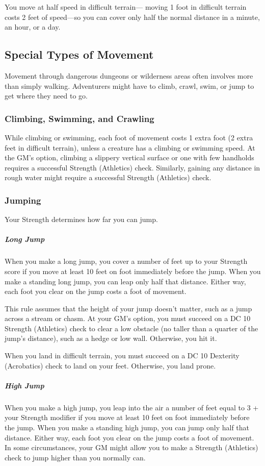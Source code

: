 You move at half speed in difficult terrain— moving 1 foot in difficult terrain costs 2 feet of speed—so you can cover only half the normal distance in a minute, an hour, or a day.

\subsection{Special Types of Movement}

Movement through dangerous dungeons or wilderness areas often involves more than simply walking. Adventurers might have to climb, crawl, swim, or jump to get where they need to go.

\subsubsection{Climbing, Swimming, and Crawling}

While climbing or swimming, each foot of movement costs 1 extra foot (2 extra feet in difficult terrain), unless a creature has a climbing or swimming speed. At the GM's option, climbing a slippery vertical surface or one with few handholds requires a successful Strength (Athletics) check. Similarly, gaining any distance in rough water might require a successful Strength (Athletics) check.

\subsubsection{Jumping}

Your Strength determines how far you can jump.

\subparagraph*{Long Jump} When you make a long jump, you cover a number of feet up to your Strength score if you move at least 10 feet on foot immediately before the jump. When you make a standing long jump, you can leap only half that distance. Either way, each foot you clear on the jump costs a foot of movement.

This rule assumes that the height of your jump doesn't matter, such as a jump across a stream or chasm. At your GM's option, you must succeed on a DC 10 Strength (Athletics) check to clear a low obstacle (no taller than a quarter of the jump's distance), such as a hedge or low wall. Otherwise, you hit it.

When you land in difficult terrain, you must succeed on a DC 10 Dexterity (Acrobatics) check to land on your feet. Otherwise, you land prone.

\subparagraph*{High Jump} When you make a high jump, you leap into the air a number of feet equal to 3 + your Strength modifier if you move at least 10 feet on foot immediately before the jump. When you make a standing high jump, you can jump only half that distance. Either way, each foot you clear on the jump costs a foot of movement. In some circumstances, your GM might allow you to make a Strength (Athletics) check to jump higher than you normally can.

